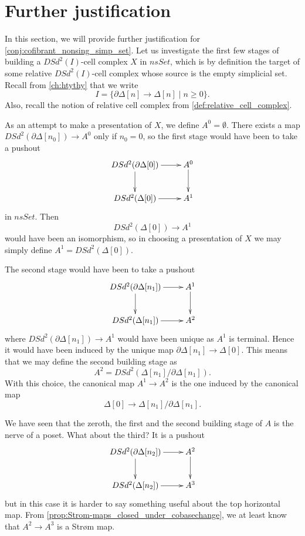 

\section{Further justification}
\label{sec:justification}

In this section, we will provide further justification for \cref{conj:cofibrant_nonsing_simp_set}. Let us investigate the first few stages of building a $DSd^2(I)$-cell complex $X$ in $nsSet$, which is by definition the target of some relative $DSd^2(I)$-cell complex whose source is the empty simplicial set. Recall from \cref{ch:htythy} that we write
\[I=\{ \partial \Delta [n]\to \Delta [n]\mid n\geq 0\} .\]
Also, recall the notion of relative cell complex from \cref{def:relative_cell_complex}.

As an attempt to make a presentation of $X$, we define $A^0=\emptyset$. There exists a map $DSd^2(\partial \Delta [n_0])\to A^0$ only if $n_0=0$, so the first stage would have been to take a pushout
\begin{displaymath}
\xymatrix{
DSd^2(\partial \Delta [0]) \ar[d] \ar[r] & A^0 \ar[d] \\
DSd^2(\Delta [0]) \ar[r] & A^1
}
\end{displaymath}
in $nsSet$. Then
\[DSd^2(\Delta [0])\to A^1\]
would have been an isomorphism, so in choosing a presentation of $X$ we may simply define $A^1=DSd^2(\Delta [0])$.

The second stage would have been to take a pushout
\begin{displaymath}
\xymatrix{
DSd^2(\partial \Delta [n_1]) \ar[d] \ar[r] & A^1 \ar[d] \\
DSd^2(\Delta [n_1]) \ar[r] & A^2
}
\end{displaymath}
where $DSd^2(\partial \Delta [n_1])\to A^1$ would have been unique as $A^1$ is terminal. Hence it would have been induced by the unique map $\partial \Delta [n_1]\to \Delta [0]$. This means that we may define the second building stage as
\[A^2=DSd^2(\Delta [n_1]/\partial \Delta [n_1]).\]
With this choice, the canonical map $A^1\to A^2$ is the one induced by the canonical map
\[\Delta [0]\to \Delta [n_1]/\partial \Delta [n_1].\]

We have seen that the zeroth, the first and the second building stage of $A$ is the nerve of a poset. What about the third? It is a pushout
\begin{equation}
\label{eq:first_diagram_conjecture_cofibrant_justification}
\begin{gathered}
\xymatrix{
DSd^2(\partial \Delta [n_2]) \ar[d] \ar[r] & A^2 \ar[d] \\
DSd^2(\Delta [n_2]) \ar[r] & A^3
}
\end{gathered}
\end{equation}
but in this case it is harder to say something useful about the top horizontal map. From \cref{prop:Strom-maps_closed_under_cobasechange}, we at least know that $A^2\to A^3$ is a Str\o m map.

